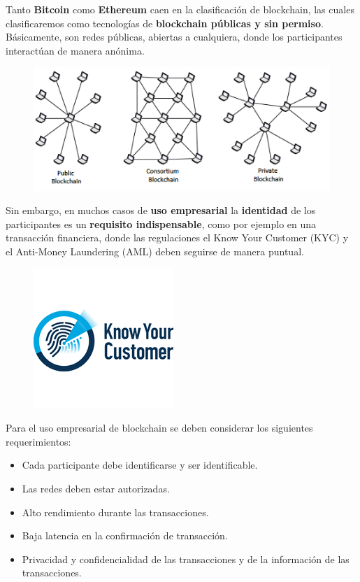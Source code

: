 \documentclass{beamer}
\begin{document}
	\begin{frame}
		Tanto \textbf{Bitcoin} como \textbf{Ethereum} caen en la clasificación de blockchain, las cuales clasificaremos como tecnologías de \textbf{blockchain públicas y sin permiso}. Básicamente, son redes públicas, abiertas a cualquiera, donde los participantes interactúan de manera anónima.
		\begin{figure}[h]
			\includegraphics[scale=.7]{types_block}
			\centering
		\end{figure}
	\end{frame}

	\begin{frame}
		Sin embargo, en muchos casos de \textbf{uso empresarial} la \textbf{identidad} de los participantes es un \textbf{requisito indispensable}, como por ejemplo en una transacción financiera, donde las regulaciones el Know Your Customer (KYC) y el Anti-Money Laundering (AML) deben seguirse de manera puntual.
		\begin{figure}[h]
			\includegraphics[scale=.5]{kyc_logo}
			\centering
		\end{figure}
	\end{frame}
	
	\begin{frame}
		Para el uso empresarial de blockchain se deben considerar los siguientes requerimientos:
		
		\begin{itemize}
			\item Cada participante debe identificarse y ser identificable.
			\item Las redes deben estar autorizadas.
			\item Alto rendimiento durante las transacciones.
			\item Baja latencia en la confirmación de transacción.
			\item Privacidad y confidencialidad de las transacciones y de la información de las transacciones.
		\end{itemize}
	\end{frame}
\end{document}
